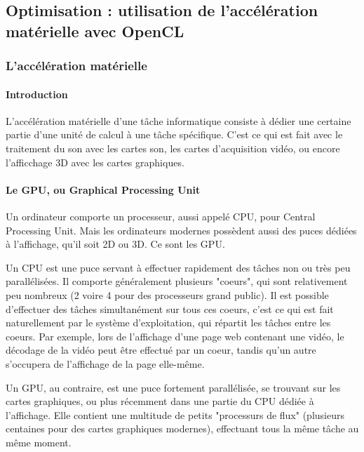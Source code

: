 

\subsection{Optimisation : utilisation de l'accélération matérielle avec OpenCL}

\subsubsection{L'accélération matérielle}

\paragraph{Introduction}
L'accélération matérielle d'une tâche informatique consiste à dédier une certaine partie d'une unité de calcul à une tâche spécifique. 
C'est ce qui est fait avec le traitement du son avec les cartes son, les cartes d'acquisition vidéo, ou encore l'afficchage 3D avec les cartes graphiques.

\paragraph{Le GPU, ou Graphical Processing Unit}

Un ordinateur comporte un processeur, aussi appelé CPU, pour Central Processing Unit. Mais les ordinateurs modernes possèdent aussi des puces dédiées à l'affichage, qu'il soit 2D ou 3D. Ce sont les GPU.

Un CPU est une puce servant à effectuer rapidement des tâches non ou très peu parallélisées. Il comporte généralement plusieurs "coeurs", qui sont relativement peu nombreux (2 voire 4 pour des processeurs grand public). Il est possible d'effectuer des tâches simultanément sur tous ces coeurs, c'est ce qui est fait naturellement par le système d'exploitation, qui répartit les tâches entre les coeurs. Par exemple, lors de l'affichage d'une page web contenant une vidéo, le décodage de la vidéo peut être effectué par un coeur, tandis qu'un autre s'occupera de l'affichage de la page elle-même.

Un GPU, au contraire, est une puce fortement parallélisée, se trouvant sur les cartes graphiques, ou plus récemment dans une partie du CPU dédiée à l'affichage. Elle contient une multitude de petits "processurs de flux" (plusieurs centaines pour des cartes graphiques modernes), effectuant tous la même tâche au même moment.

